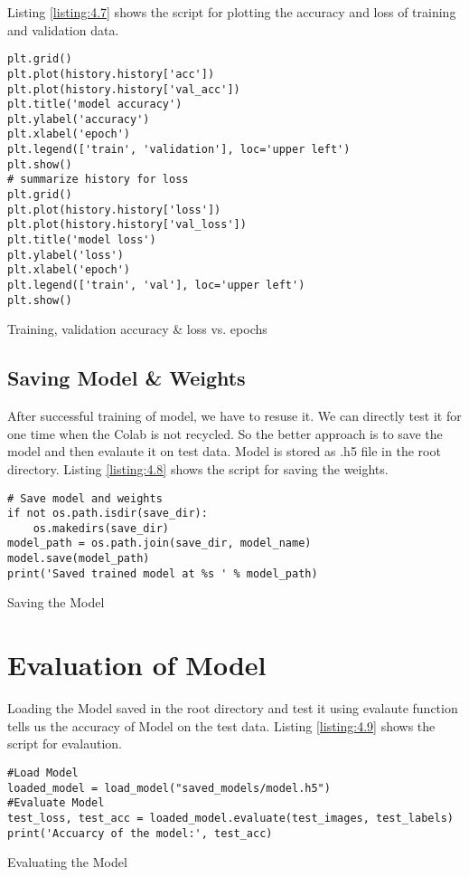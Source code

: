 Listing \ref{listing:4.7} shows the script for plotting the accuracy and
loss of training and validation data.

\begin{longlisting}
    \begin{verbatim}
plt.grid()
plt.plot(history.history['acc'])
plt.plot(history.history['val_acc'])
plt.title('model accuracy')
plt.ylabel('accuracy')
plt.xlabel('epoch')
plt.legend(['train', 'validation'], loc='upper left')
plt.show()
# summarize history for loss
plt.grid()
plt.plot(history.history['loss'])
plt.plot(history.history['val_loss'])
plt.title('model loss')
plt.ylabel('loss')
plt.xlabel('epoch')
plt.legend(['train', 'val'], loc='upper left')
plt.show()
\end{verbatim}
\caption{Training, validation accuracy \& loss vs. epochs}
\label{listing:4.7}
\end{longlisting}

\subsection{Saving Model \& Weights}
After successful training of model, we have to resuse it. We can directly test it for one time
when the Colab is not recycled. So the better approach is to save the model
and then evalaute it on test data. Model is stored as .h5 file in the root directory.
Listing \ref{listing:4.8} shows the script for saving the weights.

\begin{listing}[H]
    \begin{verbatim}
# Save model and weights
if not os.path.isdir(save_dir):
    os.makedirs(save_dir)
model_path = os.path.join(save_dir, model_name)
model.save(model_path)
print('Saved trained model at %s ' % model_path)
\end{verbatim}
\caption{Saving the Model}
\label{listing:4.8}
\end{listing}
\section{Evaluation of Model}
Loading the Model saved in the root directory and test it using evalaute function
tells us the accuracy of Model on the test data. Listing \ref{listing:4.9} shows the script for
evalaution.
\begin{listing}[H]
    \begin{verbatim}
#Load Model
loaded_model = load_model("saved_models/model.h5")
#Evaluate Model
test_loss, test_acc = loaded_model.evaluate(test_images, test_labels)
print('Accuarcy of the model:', test_acc)
\end{verbatim}
\caption{Evaluating the Model}
\label{listing:4.9}
\end{listing}
